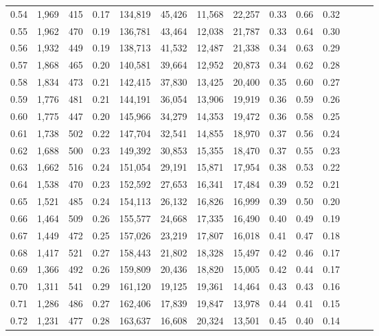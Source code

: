 \begin{tabular}{rrrrrrrrrrrrrr}
0.54 &  1,969 &  415 &  0.17 &  134,819 &   45,426 &  11,568 &  22,257 &  0.33 &  0.66 &      0.32 \\
0.55 &  1,962 &  470 &  0.19 &  136,781 &   43,464 &  12,038 &  21,787 &  0.33 &  0.64 &      0.30 \\
0.56 &  1,932 &  449 &  0.19 &  138,713 &   41,532 &  12,487 &  21,338 &  0.34 &  0.63 &      0.29 \\
0.57 &  1,868 &  465 &  0.20 &  140,581 &   39,664 &  12,952 &  20,873 &  0.34 &  0.62 &      0.28 \\
0.58 &  1,834 &  473 &  0.21 &  142,415 &   37,830 &  13,425 &  20,400 &  0.35 &  0.60 &      0.27 \\
0.59 &  1,776 &  481 &  0.21 &  144,191 &   36,054 &  13,906 &  19,919 &  0.36 &  0.59 &      0.26 \\
0.60 &  1,775 &  447 &  0.20 &  145,966 &   34,279 &  14,353 &  19,472 &  0.36 &  0.58 &      0.25 \\
0.61 &  1,738 &  502 &  0.22 &  147,704 &   32,541 &  14,855 &  18,970 &  0.37 &  0.56 &      0.24 \\
0.62 &  1,688 &  500 &  0.23 &  149,392 &   30,853 &  15,355 &  18,470 &  0.37 &  0.55 &      0.23 \\
0.63 &  1,662 &  516 &  0.24 &  151,054 &   29,191 &  15,871 &  17,954 &  0.38 &  0.53 &      0.22 \\
0.64 &  1,538 &  470 &  0.23 &  152,592 &   27,653 &  16,341 &  17,484 &  0.39 &  0.52 &      0.21 \\
0.65 &  1,521 &  485 &  0.24 &  154,113 &   26,132 &  16,826 &  16,999 &  0.39 &  0.50 &      0.20 \\
0.66 &  1,464 &  509 &  0.26 &  155,577 &   24,668 &  17,335 &  16,490 &  0.40 &  0.49 &      0.19 \\
0.67 &  1,449 &  472 &  0.25 &  157,026 &   23,219 &  17,807 &  16,018 &  0.41 &  0.47 &      0.18 \\
0.68 &  1,417 &  521 &  0.27 &  158,443 &   21,802 &  18,328 &  15,497 &  0.42 &  0.46 &      0.17 \\
0.69 &  1,366 &  492 &  0.26 &  159,809 &   20,436 &  18,820 &  15,005 &  0.42 &  0.44 &      0.17 \\
0.70 &  1,311 &  541 &  0.29 &  161,120 &   19,125 &  19,361 &  14,464 &  0.43 &  0.43 &      0.16 \\
0.71 &  1,286 &  486 &  0.27 &  162,406 &   17,839 &  19,847 &  13,978 &  0.44 &  0.41 &      0.15 \\
0.72 &  1,231 &  477 &  0.28 &  163,637 &   16,608 &  20,324 &  13,501 &  0.45 &  0.40 &      0.14 \\

\end{tabular}
